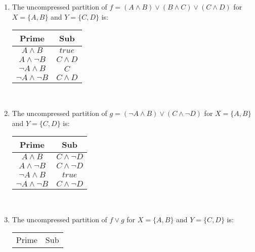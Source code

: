 \documentclass{article}
\begin{document}
 \section{}
\renewcommand{\labelenumi}{(\alph{enumi})}
 \begin{enumerate}
\item The uncompressed partition of $f = (A \land B)\lor(B \land C)\lor(C \land D)$ for $X = \{A,B\}$ and $Y = \{C, D\}$ is:
    \begin{center}
           \begin{tabular}{ |c|c| }
            \hline
             Prime&Sub \\ 
             \hline
             $A \land B$ & $true$ \\
             \hline
             $A \land \lnot B$ & $C \land D$ \\
             \hline
             $\lnot A \land B$ & $C$ \\
             \hline
             $\lnot A \land \lnot B$ & $C \land D$ \\
             \hline
            \end{tabular} \\
    \end{center}
\item The uncompressed partition of $g = (\lnot A \land B)\lor(C \land \lnot D)$ for $X = \{A,B\}$ and $Y = \{C, D\}$ is:
    \begin{center}
           \begin{tabular}{ |c|c| }
            \hline
             Prime&Sub \\ 
             \hline
             $A \land B$ & $C \land \lnot D$ \\
             \hline
             $A \land \lnot B$ & $C \land \lnot D$ \\
             \hline
             $\lnot A \land B$ & $true$ \\
             \hline
             $\lnot A \land \lnot B$ & $C \land \lnot D$ \\
             \hline
            \end{tabular} \\
    \end{center}
\item The uncompressed partition of $f \lor g$ for $X = \{A,B\}$ and $Y = \{C, D\}$ is:
    \begin{center}
           \begin{tabular}{ |c|c| }
            \hline
             Prime&Sub \\ 

\end{tabular}
\end{center}
\end{enumerate}
\end{document}
